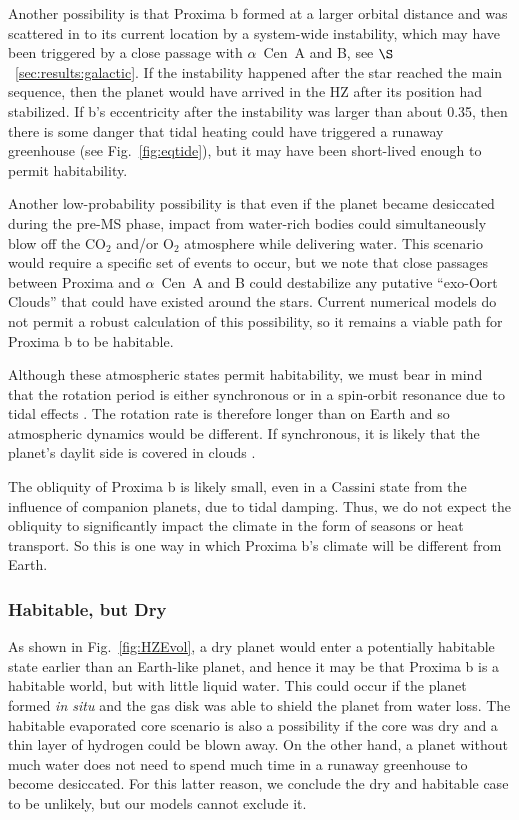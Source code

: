 \documentclass[preprint,12pt]{aastex}
\def\acen{{$\alpha$~Cen}}
\begin{document}
Another possibility is that Proxima b formed at a larger orbital
distance and was scattered in to its current location by a system-wide
instability, which may have been triggered by a close passage with
\acen~A and B, see $\S$~\ref{sec:results:galactic}. If the instability
happened after the star reached the main sequence, then the planet
would have arrived in the HZ after its position had stabilized. If b's
eccentricity after the instability was larger than about 0.35, then
there is some danger that tidal heating could have triggered a runaway
greenhouse (see Fig.~\ref{fig:eqtide}), but it may have been
short-lived enough to permit habitability.

Another low-probability possibility is that even if the planet became
desiccated during the pre-MS phase, impact from water-rich bodies
could simultaneously blow off the CO$_2$ and/or O$_2$ atmosphere while
delivering water. This scenario would require a specific set of events
to occur, but we note that close passages between Proxima and \acen~A
and B could destabilize any putative ``exo-Oort Clouds'' that could
have existed around the stars. Current numerical models do not permit
a robust calculation of this possibility, so it remains a viable path
for Proxima b to be habitable.

Although these atmospheric states permit habitability, we must bear in
mind that the rotation period is either synchronous or in a spin-orbit
resonance due to tidal effects \citep{Rodriguez12}. The rotation rate
is therefore longer than on Earth and so atmospheric dynamics would be
different. If synchronous, it is likely that the planet's daylit side
is covered in clouds \citep{Yang13}.

The obliquity of Proxima b is likely small, even in a Cassini state 
from the influence of companion
planets, due to tidal damping. Thus, we do not expect the 
obliquity to significantly impact the climate in the form of seasons or heat 
transport. So this is one way in which Proxima b's climate will be 
different from Earth. 

\subsubsection{Habitable, but Dry}

As shown in Fig.~\ref{fig:HZEvol}, a dry planet would enter a
potentially habitable state earlier than an Earth-like planet, and
hence it may be that Proxima b is a habitable world, but with little
liquid water. This could occur if the planet formed {\it in situ} and
the gas disk was able to shield the planet from water loss. The
habitable evaporated core scenario is also a possibility if the core
was dry and a thin layer of hydrogen could be blown away. On the other
hand, a planet without much water does not need to spend much time in
a runaway greenhouse to become desiccated. For this latter reason, we
conclude the dry and habitable case to be unlikely, but our models
cannot exclude it.
\end{document}
